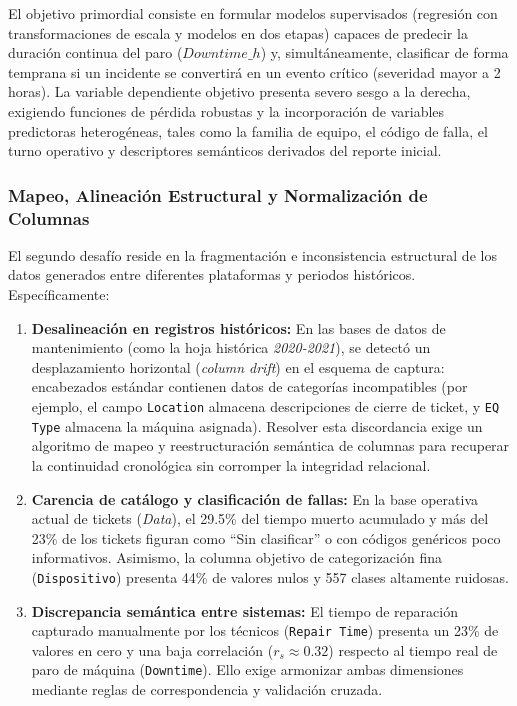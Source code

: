 \documentclass[conference]{IEEEtran}
\begin{document}
El objetivo primordial consiste en formular modelos supervisados (regresión con transformaciones de escala y modelos en dos etapas) capaces de predecir la duración continua del paro ($Downtime\_h$) y, simultáneamente, clasificar de forma temprana si un incidente se convertirá en un evento crítico (severidad mayor a 2 horas). La variable dependiente objetivo presenta severo sesgo a la derecha, exigiendo funciones de pérdida robustas y la incorporación de variables predictoras heterogéneas, tales como la familia de equipo, el código de falla, el turno operativo y descriptores semánticos derivados del reporte inicial.

\subsubsection{Mapeo, Alineación Estructural y Normalización de Columnas}
El segundo desafío reside en la fragmentación e inconsistencia estructural de los datos generados entre diferentes plataformas y periodos históricos. Específicamente:
\begin{enumerate}
    \item \textbf{Desalineación en registros históricos:} En las bases de datos de mantenimiento (como la hoja histórica \textit{2020-2021}), se detectó un desplazamiento horizontal (\textit{column drift}) en el esquema de captura: encabezados estándar contienen datos de categorías incompatibles (por ejemplo, el campo \texttt{Location} almacena descripciones de cierre de ticket, y \texttt{EQ Type} almacena la máquina asignada). Resolver esta discordancia exige un algoritmo de mapeo y reestructuración semántica de columnas para recuperar la continuidad cronológica sin corromper la integridad relacional.
    \item \textbf{Carencia de catálogo y clasificación de fallas:} En la base operativa actual de tickets (\textit{Data}), el 29.5\% del tiempo muerto acumulado y más del 23\% de los tickets figuran como ``Sin clasificar'' o con códigos genéricos poco informativos. Asimismo, la columna objetivo de categorización fina (\texttt{Dispositivo}) presenta 44\% de valores nulos y 557 clases altamente ruidosas.
    \item \textbf{Discrepancia semántica entre sistemas:} El tiempo de reparación capturado manualmente por los técnicos (\texttt{Repair Time}) presenta un 23\% de valores en cero y una baja correlación ($r_s \approx 0.32$) respecto al tiempo real de paro de máquina (\texttt{Downtime}). Ello exige armonizar ambas dimensiones mediante reglas de correspondencia y validación cruzada.
\end{enumerate}
\end{document}
